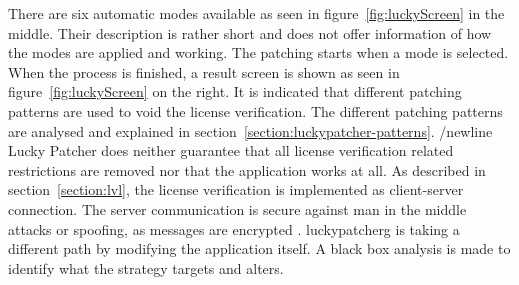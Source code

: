 \newline
There are six automatic modes available as seen in figure~\ref{fig:luckyScreen} in the middle.
Their description is rather short and does not offer information of how the modes are applied and working.
\newline
The patching starts when a mode is selected.
When the process is finished, a result screen is shown as seen in figure~\ref{fig:luckyScreen} on the right.
It is indicated that different patching patterns are used to void the license verification.
The different patching patterns are analysed and explained in section~\ref{section:luckypatcher-patterns}.
/newline
Lucky Patcher does neither guarantee that all license verification related restrictions are removed nor that the application works at all.
\newline
\newline
As described in section~\ref{section:lvl}, the license verification is implemented as client-server connection.
The server communication is secure against man in the middle attacks or spoofing, as messages are encrypted \cite{munteanLicense}.
\gls{luckypatcherg} is taking a different path by modifying the application itself.
A black box analysis is made to identify what the strategy targets and alters.
